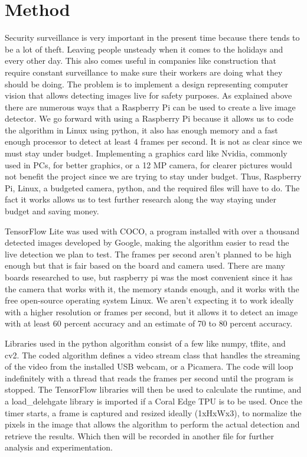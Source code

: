 \section{Method}

Security surveillance  is very important in the present time because there tends to be a lot of theft. Leaving people unsteady when it comes to the holidays and every other day. This also comes useful in companies like construction that require constant surveillance to make sure their workers are doing what they should be doing. The problem is to implement a design representing computer vision that allows detecting images live for safety purposes. As explained above there are numerous ways that a Raspberry Pi can be used to create a live image detector. We go forward with using a Raspberry Pi because it allows us to code the algorithm in Linux using python, it also has enough memory and a fast enough processor to detect at least 4 frames per second. It is not as clear since we must stay under budget. Implementing a graphics card like Nvidia, commonly used in PCs, for better graphics, or a 12 MP camera, for clearer pictures would not benefit the project since we are trying to stay under budget. Thus, Raspberry Pi, Linux, a budgeted camera, python, and the required files will have to do. The fact it works allows us to test further research along the way staying under budget and saving money.

TensorFlow Lite was used with COCO, a program installed with over a thousand detected images developed by Google, making the algorithm easier to read the live detection we plan to test. The frames per second aren’t planned to be high enough but that is fair based on the board and camera used. There are many boards researched to use, but raspberry pi was the most convenient since it has the camera that works with it, the memory stands enough, and it works with the free open-source operating system Linux. We aren’t expecting it to work ideally with a higher resolution or frames per second, but it allows it to detect an image with at least 60 percent accuracy and an estimate of 70 to 80 percent accuracy.

Libraries used in the python algorithm consist of a few like numpy, tflite, and cv2. The coded algorithm defines a video stream class that handles the streaming of the video from the installed USB webcam, or a Picamera. The code will loop indefinitely with a thread that reads the frames per second until the program is stopped. The TensorFlow libraries will then be used to calculate the runtime, and a load\_delehgate library is imported if a Coral Edge TPU is to be used. Once the timer starts, a frame is captured and resized ideally (1xHxWx3), to normalize the pixels in the image that allows the algorithm to perform the actual detection and retrieve the results. Which then will be recorded in another file for further analysis and experimentation.

